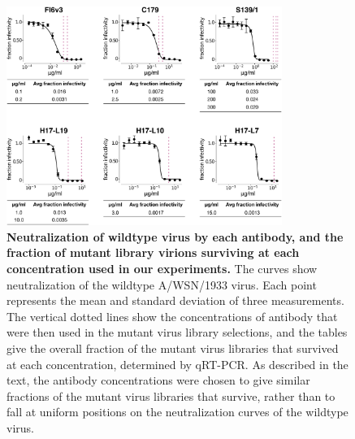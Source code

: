 \documentclass[11pt]{article}
\begin{document}
\begin{figure}
\centerline{\includegraphics[width=0.8\textwidth]{Fig3.pdf}}
\caption{\label{fig:neutcurves}
{\bf Neutralization of wildtype virus by each antibody, and the fraction of mutant library virions surviving at each concentration used in our experiments.}
The curves show neutralization of the wildtype A/WSN/1933 virus. 
Each point represents the mean and standard deviation of three measurements. 
The vertical dotted lines show the concentrations of antibody that were then used in the mutant virus library selections, and the tables give the overall fraction of the mutant virus libraries that survived at each concentration, determined by qRT-PCR.
As described in the text, the antibody concentrations were chosen to give similar fractions of the mutant virus libraries that survive, rather than to fall at uniform positions on the neutralization curves of the wildtype virus.
}
\end{figure}

\clearpage
\end{document}
